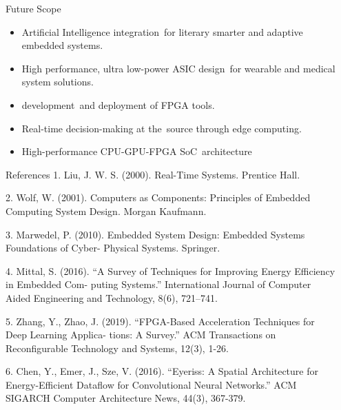 \documentclass[final]{beamer}
\newlength{\sepwidth}
\newlength{\colwidth}
\newcommand{\separatorcolumn}{\begin{column}{\sepwidth}\end{column}}
\begin{document}
\begin{frame}[t]
\begin{columns}[t]
\begin{column}{\colwidth}
  \begin{block}{Future Scope}
    \begin{itemize}
      \item Artificial Intelligence integration for literary smarter and adaptive embedded systems.
      
      \item High performance, ultra low-power ASIC design for wearable and medical system solutions.
      
      \item development and deployment of FPGA tools.
      
      \item Real-time decision-making at the source through edge computing.
      
      \item High-performance CPU-GPU-FPGA SoC architecture
      
    \end{itemize}
  \end{block}

  \begin{block}{References}
1. Liu, J. W. S. (2000). Real-Time Systems. Prentice Hall.

2. Wolf, W. (2001). Computers as Components: Principles of Embedded Computing System Design.
Morgan Kaufmann.

3. Marwedel, P. (2010). Embedded System Design: Embedded Systems Foundations of Cyber-
Physical Systems. Springer.

4. Mittal, S. (2016). “A Survey of Techniques for Improving Energy Efficiency in Embedded Com-
puting Systems.” International Journal of Computer Aided Engineering and Technology, 8(6), 721–741.

5. Zhang, Y., Zhao, J. (2019). “FPGA-Based Acceleration Techniques for Deep Learning Applica-
tions: A Survey.” ACM Transactions on Reconfigurable Technology and Systems, 12(3), 1-26.

6. Chen, Y., Emer, J., Sze, V. (2016). “Eyeriss: A Spatial Architecture for Energy-Efficient Dataflow
for Convolutional Neural Networks.” ACM SIGARCH Computer Architecture News, 44(3), 367-379.

    \footnotesize
    
    
  \end{block}

\end{column}

\separatorcolumn
\end{columns}
\end{frame}
\end{document}
